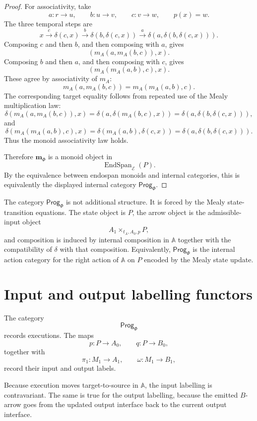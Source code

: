 \begin{proof}
For associativity, take
\[
a:r\to u,
\qquad
b:u\to v,
\qquad
c:v\to w,
\qquad
p(x)=w.
\]
The three temporal steps are
\[
x
\xrightarrow{c}
\delta(c,x)
\xrightarrow{b}
\delta(b,\delta(c,x))
\xrightarrow{a}
\delta(a,\delta(b,\delta(c,x))).
\]
Composing \(c\) and then \(b\), and then composing with \(a\), gives
\[
(m_A(a,m_A(b,c)),x).
\]
Composing \(b\) and then \(a\), and then composing with \(c\), gives
\[
(m_A(m_A(a,b),c),x).
\]
These agree by associativity of \(m_A\):
\[
m_A(a,m_A(b,c))
=
m_A(m_A(a,b),c).
\]
The corresponding target equality follows from repeated use of the Mealy multiplication law:
\[
\delta(m_A(a,m_A(b,c)),x)
=
\delta(a,\delta(m_A(b,c),x))
=
\delta(a,\delta(b,\delta(c,x))),
\]
and
\[
\delta(m_A(m_A(a,b),c),x)
=
\delta(m_A(a,b),\delta(c,x))
=
\delta(a,\delta(b,\delta(c,x))).
\]
Thus the monoid associativity law holds.

Therefore \(\mathbf m_\Phi\) is a monoid object in
\[
\operatorname{EndSpan}_{\mathcal E}(P).
\]
By the equivalence between endospan monoids and internal categories, this is equivalently the displayed internal category \(\mathsf{Prog}_\Phi\).
\end{proof}

\begin{remark}
\label{rem:program-category-forced}
The category \(\mathsf{Prog}_\Phi\) is not additional structure. It is forced by the Mealy state-transition equations. The state object is \(P\), the arrow object is the admissible-input object
\[
A_1\times_{t_A,A_0,p}P,
\]
and composition is induced by internal composition in \(\mathbb A\) together with the compatibility of \(\delta\) with that composition. Equivalently, \(\mathsf{Prog}_\Phi\) is the internal action category for the right action of \(\mathbb A\) on \(P\) encoded by the Mealy state update.
\end{remark}

\section{Input and output labelling functors}
\label{sec:input-output-labelling-functors}

The category
\[
\mathsf{Prog}_\Phi
\]
records executions. The maps
\[
p:P\to A_0,
\qquad
q:P\to B_0,
\]
together with
\[
\pi_1:M_1\to A_1,
\qquad
\omega:M_1\to B_1,
\]
record their input and output labels.

Because execution moves target-to-source in \(\mathbb A\), the input labelling is contravariant. The same is true for the output labelling, because the emitted \(B\)-arrow goes from the updated output interface back to the current output interface.

